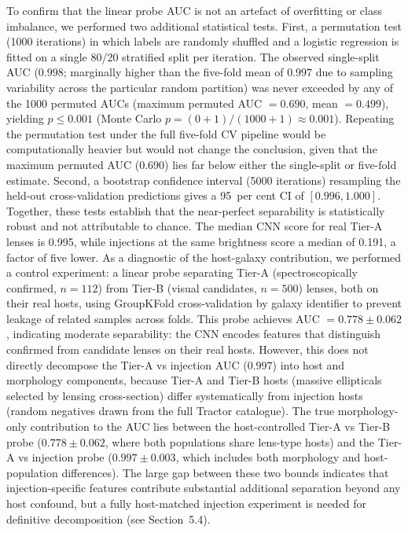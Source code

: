 \documentclass[fleqn,usenatbib]{mnras}
\begin{document}
To confirm that the linear probe AUC is not an artefact of overfitting or class imbalance, we performed two additional statistical tests.  First, a permutation test (1000 iterations) in which labels are randomly shuffled and a logistic regression is fitted on a single 80/20 stratified split per iteration.  The observed single-split AUC ($0.998$; marginally higher than the five-fold mean of $0.997$ due to sampling variability across the particular random partition) was never exceeded by any of the 1000 permuted AUCs (maximum permuted AUC $= 0.690$, mean $= 0.499$), yielding $p \leq 0.001$ (Monte Carlo $p = (0+1)/(1000+1) \approx 0.001$).  Repeating the permutation test under the full five-fold CV pipeline would be computationally heavier but would not change the conclusion, given that the maximum permuted AUC ($0.690$) lies far below either the single-split or five-fold estimate.  Second, a bootstrap confidence interval (5000 iterations) resampling the held-out cross-validation predictions gives a 95~per cent CI of $[0.996, 1.000]$.  Together, these tests establish that the near-perfect separability is statistically robust and not attributable to chance.  The median CNN score for real Tier-A lenses is 0.995, while injections at the same brightness score a median of 0.191, a factor of five lower.  As a diagnostic of the host-galaxy contribution, we performed a control experiment: a linear probe separating Tier-A (spectroscopically confirmed, $n = 112$) from Tier-B (visual candidates, $n = 500$) lenses, both on their real hosts, using GroupKFold cross-validation by galaxy identifier to prevent leakage of related samples across folds.  This probe achieves AUC $= 0.778 \pm 0.062$, indicating moderate separability: the CNN encodes features that distinguish confirmed from candidate lenses on their real hosts.  However, this does not directly decompose the Tier-A vs injection AUC ($0.997$) into host and morphology components, because Tier-A and Tier-B hosts (massive ellipticals selected by lensing cross-section) differ systematically from injection hosts (random negatives drawn from the full Tractor catalogue).  The true morphology-only contribution to the AUC lies between the host-controlled Tier-A vs Tier-B probe ($0.778 \pm 0.062$, where both populations share lens-type hosts) and the Tier-A vs injection probe ($0.997 \pm 0.003$, which includes both morphology and host-population differences).  The large gap between these two bounds indicates that injection-specific features contribute substantial additional separation beyond any host confound, but a fully host-matched injection experiment is needed for definitive decomposition (see Section~5.4).
\end{document}
